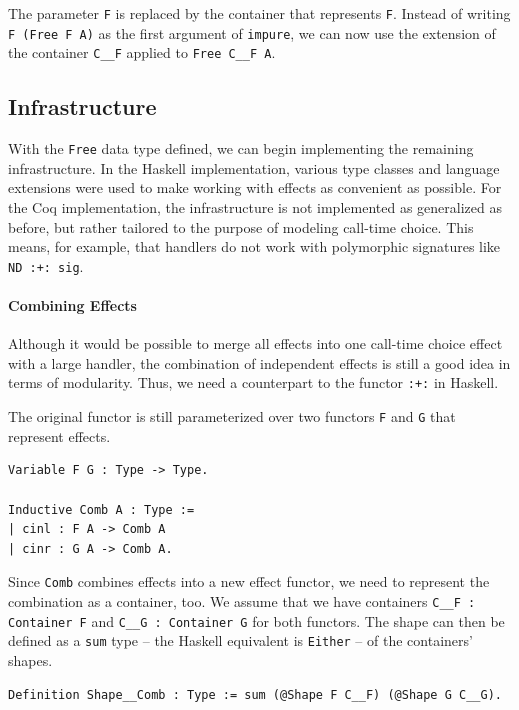\documentclass[a4paper, 11pt, fleqn, twoside]{scrreprt}
\newcommand{\hinl}[1]{\texttt{#1}}
\newcommand{\cinl}[1]{\texttt{#1}}
\begin{document}
The parameter \cinl{F} is replaced by the container that represents \cinl{F}.
Instead of writing \cinl{F (Free F A)} as the first argument of \cinl{impure}, we can now use the extension of the container \cinl{C__F} applied to \cinl{Free C__F A}.

\subsection{Infrastructure}
\label{subsec:infrastructure}

With the \cinl{Free} data type defined, we can begin implementing the remaining infrastructure. 
In the Haskell implementation, various type classes and language extensions were used to make working with effects as convenient as possible.
For the Coq implementation, the infrastructure is not implemented as generalized as before, but rather tailored to the purpose of modeling call-time choice.
This means, for example, that handlers do not work with polymorphic signatures like \cinl{ND :+: sig}.

\paragraph{Combining Effects}
Although it would be possible to merge all effects into one call-time choice effect with a large handler, the combination of independent effects is still a good idea in terms of modularity.
Thus, we need a counterpart to the functor \hinl{:+:} in Haskell.

The original functor is still parameterized over two functors \cinl{F} and \cinl{G} that represent effects.

\begin{verbatim}
Variable F G : Type -> Type.

Inductive Comb A : Type :=
| cinl : F A -> Comb A
| cinr : G A -> Comb A.
\end{verbatim}

Since \cinl{Comb} combines effects into a new effect functor, we need to represent the combination as a container, too.
We assume that we have containers \cinl{C__F : Container F} and \cinl{C__G : Container G} for both functors.
The shape can then be defined as a \cinl{sum} type -- the Haskell equivalent is \hinl{Either} -- of the containers' shapes.

\begin{verbatim}
Definition Shape__Comb : Type := sum (@Shape F C__F) (@Shape G C__G).
\end{verbatim}
\end{document}
